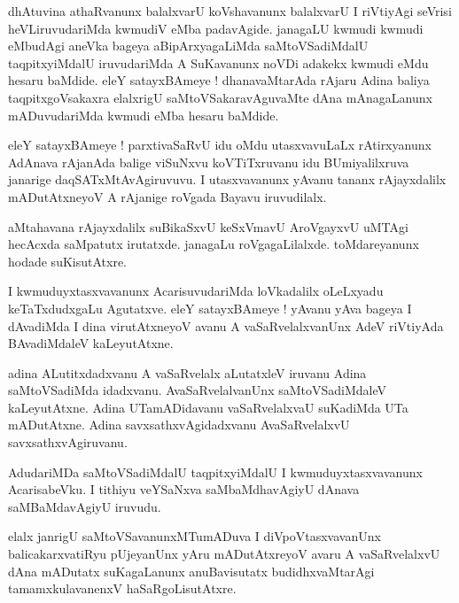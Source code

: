 \documentclass{article}
\begin{document}
\begin{mn}%
dhAtuvina athaRvanunx balalxvarU koVshavanunx balalxvarU I riVtiyAgi seVrisi heVLiruvudariMda 
kwmudiV eMba padavAgide. janagaLU kwmudi kwmudi eMbudAgi aneVka bageya aBipArxyagaLiMda 
saMtoVSadiMdalU taqpitxyiMdalU iruvudariMda A SuKavanunx noVDi adakekx kwmudi eMdu hesaru 
baMdide. eleY satayxBAmeye ! dhanavaMtarAda rAjaru Adina baliya taqpitxgoVsakaxra elalxrigU 
saMtoVSakaravAguvaMte dAna mAnagaLanunx mADuvudariMda kwmudi eMba hesaru baMdide.
\end{mn}

\begin{mn}%
eleY satayxBAmeye ! parxtivaSaRvU idu oMdu utasxvavuLaLx rAtirxyanunx AdAnava rAjanAda balige 
viSuNxvu koVTiTxruvanu idu BUmiyalilxruva janarige daqSATxMtAvAgiruvuvu. I utasxvavanunx yAvanu 
tananx rAjayxdalilx mADutAtxneyoV A rAjanige roVgada Bayavu iruvudilalx.
\end{mn}

\begin{mn}%
aMtahavana rAjayxdalilx suBikaSxvU keSxVmavU AroVgayxvU uMTAgi hecAcxda saMpatutx irutatxde. 
janagaLu roVgagaLilalxde. toMdareyanunx hodade suKisutAtxre.
\end{mn}

\begin{mn}%
I kwmuduyxtasxvavanunx AcarisuvudariMda loVkadalilx oLeLxyadu keTaTxdudxgaLu Agutatxve. eleY 
satayxBAmeye ! yAvanu yAva bageya I dAvadiMda I dina virutAtxneyoV avanu A vaSaRvelalxvanUnx AdeV 
riVtiyAda BAvadiMdaleV kaLeyutAtxne.
\end{mn}

\begin{mn}%
adina ALutitxdadxvanu A vaSaRvelalx aLutatxleV iruvanu Adina saMtoVSadiMda idadxvanu. 
AvaSaRvelalvanUnx saMtoVSadiMdaleV kaLeyutAtxne. Adina UTamADidavanu vaSaRvelalxvaU suKadiMda UTa 
mADutAtxne. Adina savxsathxvAgidadxvanu AvaSaRvelalxvU savxsathxvAgiruvanu.
\end{mn}

\begin{mn}%
AdudariMDa saMtoVSadiMdalU taqpitxyiMdalU I kwmuduyxtasxvavanunx AcarisabeVku. I tithiyu veYSaNxva 
saMbaMdhavAgiyU dAnava saMBaMdavAgiyU iruvudu.
\end{mn}

\begin{mn}%
elalx janrigU saMtoVSavanunxMTumADuva I diVpoVtasxvavanUnx balicakarxvatiRyu pUjeyanUnx yAru 
mADutAtxreyoV avaru A vaSaRvelalxvU dAna mADutatx suKagaLanunx anuBavisutatx budidhxvaMtarAgi 
tamamxkulavanenxV haSaRgoLisutAtxre.
\end{mn}
\end{document}
